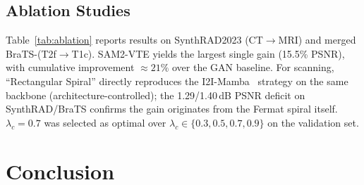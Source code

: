 \documentclass[runningheads]{llncs}
\begin{document}
\subsection{Ablation Studies}
\label{sec:ablation}

Table~\ref{tab:ablation} reports results on SynthRAD2023
(CT$\to$MRI) and merged BraTS-(T2f$\to$T1c).
SAM2-VTE yields the largest single gain (15.5\% PSNR),
with cumulative improvement ${\approx}21\%$ over the GAN baseline.
For scanning, ``Rectangular Spiral'' directly reproduces the
I2I-Mamba~\cite{xing2024i2imamba} strategy on the same backbone
(architecture-controlled); the 1.29/1.40\,dB PSNR deficit on
SynthRAD/BraTS confirms the gain
originates from the Fermat spiral itself. $\lambda_c{=}0.7$ was
selected as optimal over $\lambda_c\in\{0.3,0.5,0.7,0.9\}$ on the
validation set.

\begin{table}[h]
\caption{Ablation on SynthRAD2023(CT$\to$MRI) and merged BraTS(T2f$\to$T1c). $^*$: $p{<}0.05$ vs.\ FermatSyn.}
\label{tab:ablation}
\centering
{}%
\end{table}


\section{Conclusion}
\label{sec:conclusion}
\end{document}
